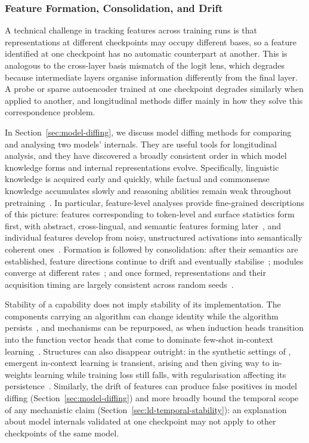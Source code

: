 \subsubsection{Feature Formation, Consolidation, and Drift}
\label{sec:ld-features}

A technical challenge in tracking features across training runs is that representations at different checkpoints may occupy different bases, so a feature identified at one checkpoint has no automatic counterpart at another. This is analogous to the cross-layer basis mismatch of the logit lens, which degrades because intermediate layers organise information differently from the final layer. A probe or sparse autoencoder trained at one checkpoint degrades similarly when applied to another, and longitudinal methods differ mainly in how they solve this correspondence problem.

In Section~\ref{sec:model-diffing}, we discuss model diffing methods for comparing and analysing two models' internals. They are useful tools for longitudinal analysis, and they have discovered a broadly consistent order in which model knowledge forms and internal representations evolve. Specifically, linguistic knowledge is acquired early and quickly, while factual and commonsense knowledge accumulates slowly and reasoning abilities remain weak throughout pretraining~. In particular, feature-level analyses provide fine-grained descriptions of this picture: features corresponding to token-level and surface statistics form first, with abstract, cross-lingual, and semantic features forming later~, and individual features develop from noisy, unstructured activations into semantically coherent ones~. Formation is followed by consolidation: after their semantics are established, feature directions continue to drift and eventually stabilise~; modules converge at different rates~; and once formed, representations and their acquisition timing are largely consistent across random seeds~.

Stability of a capability does not imply stability of its implementation. The components carrying an algorithm can change identity while the algorithm persists~, and mechanisms can be repurposed, as when induction heads transition into the function vector heads that come to dominate few-shot in-context learning~. Structures can also disappear outright: in the synthetic settings of , emergent in-context learning is transient, arising and then giving way to in-weights learning while training loss still falls, with regularisation affecting its persistence~. Similarly, the drift of features can produce false positives in model diffing (Section~\ref{sec:model-diffing}) and more broadly bound the temporal scope of any mechanistic claim (Section~\ref{sec:ld-temporal-stability}): an explanation about model internals validated at one checkpoint may not apply to other checkpoints of the same model.

